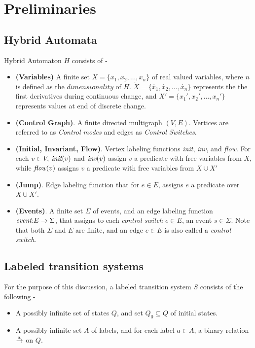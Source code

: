 \documentclass[]{article}
\begin{document}
\section{Preliminaries}
\subsection{Hybrid Automata}
Hybrid Automaton $H$ consists of -
\begin{itemize}
  \item \textbf{(Variables)} A finite set $X = \{x_1, x_2, \dots, x_n\} $ of real valued variables,
    where $n$ is defined as the $dimensionality$ of $H$.
     $\dot{X} = \{\dot{x_1}, \dot{x_2}, \dots, \dot{x_n} \}$ represents the
     the first derivatives during continuous change, and $X' = \{x_1', x_2',
     \dots, x_n' \}$ represents values at end of discrete change.
   \item \textbf{(Control Graph)}. A finite directed multigraph $(V,E)$.
     Vertices are referred to as \textit{Control modes} and edges as
     \textit{Control Switches}.
   \item \textbf{(Initial, Invariant, Flow)}. Vertex labeling functions
     \textit{init}, \textit{inv}, and \textit{flow}. For each $v \in V$,
     $\textit{init}(v)$ and $\textit{inv}(v)$ assign $v$ a predicate with free variables from
     $X$, while $\textit{flow}(v)$ assigns $v$ a predicate with free variables from $X
     \cup X'$
   \item \textbf{(Jump)}. Edge labeling function that for $e \in E$, assigns $e$
     a predicate over $X \cup X'$.
   \item \textbf{(Events)}. A finite set $\Sigma$ of events, and an edge
     labeling function $\textit{event} \mathord{:} E \to \Sigma$, that assigns to each \textit{control
     switch} $e \in E$, an event $s \in \Sigma$. Note that both $\Sigma$ and $E$
     are finite, and an edge $e \in E$ is also called a \textit{control switch}.

\end{itemize}

\subsection{Labeled transition systems}
For the purpose of this discussion, a labeled transition system $S$ consists of the following -
\begin{itemize}
  \item A possibly infinite set of states $Q$, and set $Q_0 \subseteq Q$ of
    initial states.
  \item A possibly infinite set $A$ of labels, and for each label $a \in A$, a
    binary relation $\xrightarrow{\text{a}}$ on $Q$.
\end{itemize}
\end{document}
